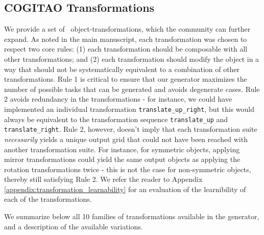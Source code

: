 \subsection{COGITAO Transformations}\label{appendix:COGITAO_transformations}


We provide a set of \ntransforms\ object-transformations, which the community can further expand. As noted in the main manuscript, each transformation was chosen to respect two core rules: (1) each transformation should be composable with all other transformations; and (2) each transformation should modify the object in a way that should not be systematically equivalent to a combination of other transformations. Rule 1 is critical to ensure that our generator maximizes the number of possible tasks that can be generated and avoids degenerate cases. Rule 2 avoids redundancy in the transformations - for instance, we could have implemented an individual transformation \texttt{translate\_up\_right}, but this would always be equivalent to the transformation sequence \texttt{translate\_up} and \texttt{translate\_right}. Rule 2, however, doesn't imply that each transformation suite \textit{necessarily} yields a unique output grid that could not have been reached with another transformation suite. For instance, for symmetric objects, applying mirror transformations could yield the same output objects as applying the rotation transformations twice - this is not the case for non-symmetric objects, thereby still satisfying Rule 2. We refer the reader to Appendix \ref{appendix:transformation_learnability} for an evaluation of the learnibility of each of the transformations. 

We summarize below all 10 families of transformations available in the generator, and a description of the available variations.


